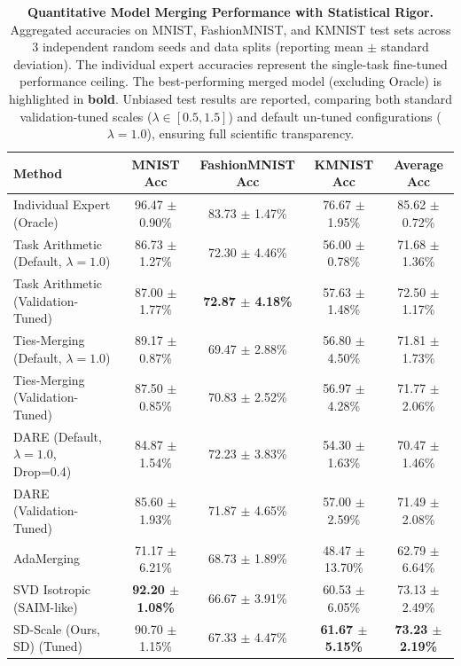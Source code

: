 \begin{table}[t]
\caption{\textbf{Quantitative Model Merging Performance with Statistical Rigor.} Aggregated accuracies on MNIST, FashionMNIST, and KMNIST test sets across 3 independent random seeds and data splits (reporting mean $\pm$ standard deviation). The individual expert accuracies represent the single-task fine-tuned performance ceiling. The best-performing merged model (excluding Oracle) is highlighted in \textbf{bold}. Unbiased test results are reported, comparing both standard validation-tuned scales ($\lambda \in [0.5, 1.5]$) and default un-tuned configurations ($\lambda=1.0$), ensuring full scientific transparency.}
\label{tab:merging_results}
\vskip 0.15in
\begin{center}
\begin{small}
\begin{sc}
\setlength{\tabcolsep}{3.0pt}
\begin{tabular}{lcccc}
\toprule
Method & MNIST Acc & FashionMNIST Acc & KMNIST Acc & Average Acc \\
\midrule
Individual Expert (Oracle) & 96.47 $\pm$ 0.90\% & 83.73 $\pm$ 1.47\% & 76.67 $\pm$ 1.95\% & 85.62 $\pm$ 0.72\% \\
\midrule
Task Arithmetic (Default, $\lambda=1.0$) & 86.73 $\pm$ 1.27\% & 72.30 $\pm$ 4.46\% & 56.00 $\pm$ 0.78\% & 71.68 $\pm$ 1.36\% \\
Task Arithmetic (Validation-Tuned) & 87.00 $\pm$ 1.77\% & \textbf{72.87 $\pm$ 4.18\%} & 57.63 $\pm$ 1.48\% & 72.50 $\pm$ 1.17\% \\
Ties-Merging (Default, $\lambda=1.0$) & 89.17 $\pm$ 0.87\% & 69.47 $\pm$ 2.88\% & 56.80 $\pm$ 4.50\% & 71.81 $\pm$ 1.73\% \\
Ties-Merging (Validation-Tuned) & 87.50 $\pm$ 0.85\% & 70.83 $\pm$ 2.52\% & 56.97 $\pm$ 4.28\% & 71.77 $\pm$ 2.06\% \\
DARE (Default, $\lambda=1.0$, Drop=0.4) & 84.87 $\pm$ 1.54\% & 72.23 $\pm$ 3.83\% & 54.30 $\pm$ 1.63\% & 70.47 $\pm$ 1.46\% \\
DARE (Validation-Tuned) & 85.60 $\pm$ 1.93\% & 71.87 $\pm$ 4.65\% & 57.00 $\pm$ 2.59\% & 71.49 $\pm$ 2.08\% \\
AdaMerging~\cite{yang2024adamerging} & 71.17 $\pm$ 6.21\% & 68.73 $\pm$ 1.89\% & 48.47 $\pm$ 13.70\% & 62.79 $\pm$ 6.64\% \\
SVD Isotropic (SAIM-like)~\cite{saim25flat} & \textbf{92.20 $\pm$ 1.08\%} & 66.67 $\pm$ 3.91\% & 60.53 $\pm$ 6.05\% & 73.13 $\pm$ 2.49\% \\
\midrule
SD-Scale (Ours, SD) (Tuned) & 90.70 $\pm$ 1.15\% & 67.33 $\pm$ 4.47\% & \textbf{61.67 $\pm$ 5.15\%} & \textbf{73.23 $\pm$ 2.19\%} \\

\end{tabular}
\end{sc}
\end{small}
\end{center}
\end{table}
